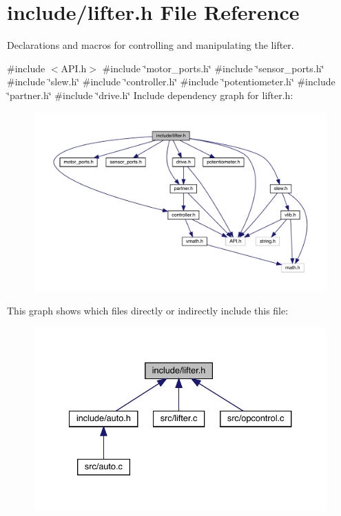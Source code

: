 \section{include/lifter.h File Reference}
\label{lifter_8h}


Declarations and macros for controlling and manipulating the lifter.  


{\ttfamily \#include $<$A\+P\+I.\+h$>$}\newline
{\ttfamily \#include \char`\"{}motor\+\_\+ports.\+h\char`\"{}}\newline
{\ttfamily \#include \char`\"{}sensor\+\_\+ports.\+h\char`\"{}}\newline
{\ttfamily \#include \char`\"{}slew.\+h\char`\"{}}\newline
{\ttfamily \#include \char`\"{}controller.\+h\char`\"{}}\newline
{\ttfamily \#include \char`\"{}potentiometer.\+h\char`\"{}}\newline
{\ttfamily \#include \char`\"{}partner.\+h\char`\"{}}\newline
{\ttfamily \#include \char`\"{}drive.\+h\char`\"{}}\newline
Include dependency graph for lifter.\+h\+:\nopagebreak
\begin{figure}[H]
\begin{center}
\leavevmode
\includegraphics[width=350pt]{lifter_8h__incl}
\end{center}
\end{figure}
This graph shows which files directly or indirectly include this file\+:\nopagebreak
\begin{figure}[H]
\begin{center}
\leavevmode
\includegraphics[width=334pt]{lifter_8h__dep__incl}
\end{center}
\end{figure}

